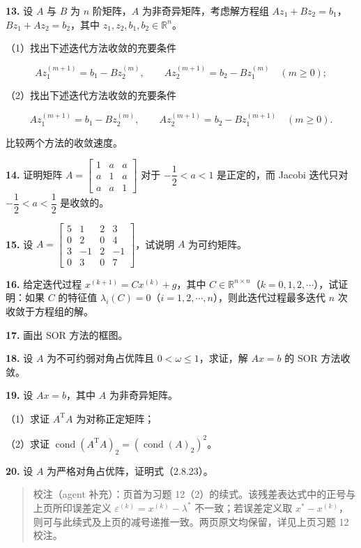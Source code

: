 \textbf{13.} 设 \(A\) 与 \(B\) 为 \(n\) 阶矩阵，\(A\) 为非奇异矩阵，考虑解方程组 \(Az_1+Bz_2=b_1\)，\(Bz_1+Az_2=b_2\)，其中 \(z_1,z_2,b_1,b_2\in\mathbb R^n\)。

（1）找出下述迭代方法收敛的充要条件

\[
Az_1^{(m+1)}=b_1-Bz_2^{(m)},\qquad Az_2^{(m+1)}=b_2-Bz_1^{(m)}\quad(m\geqslant0);
\]

（2）找出下述迭代方法收敛的充要条件

\[
Az_1^{(m+1)}=b_1-Bz_2^{(m)},\qquad Az_2^{(m+1)}=b_2-Bz_1^{(m+1)}\quad(m\geqslant0).
\]

比较两个方法的收敛速度。

\textbf{14.} 证明矩阵 \(A=\begin{bmatrix}1&a&a\\a&1&a\\a&a&1\end{bmatrix}\) 对于 \(-\dfrac12<a<1\) 是正定的，而 Jacobi 迭代只对 \(-\dfrac12<a<\dfrac12\) 是收敛的。

\textbf{15.} 设 \(A=\begin{bmatrix}5&1&2&3\\0&2&0&4\\3&-1&2&-1\\0&3&0&7\end{bmatrix}\)，试说明 \(A\) 为可约矩阵。

\textbf{16.} 给定迭代过程 \(x^{(k+1)}=Cx^{(k)}+g\)，其中 \(C\in\mathbb R^{n\times n}\)（\(k=0,1,2,\cdots\)），试证明：如果 \(C\) 的特征值 \(\lambda_i(C)=0\)（\(i=1,2,\cdots,n\)），则此迭代过程最多迭代 \(n\) 次收敛于方程组的解。

\textbf{17.} 画出 SOR 方法的框图。

\textbf{18.} 设 \(A\) 为不可约弱对角占优阵且 \(0<\omega\leqslant1\)，求证，解 \(Ax=b\) 的 SOR 方法收敛。

\textbf{19.} 设 \(Ax=b\)，其中 \(A\) 为非奇异矩阵。

（1）求证 \(A^{\mathrm T}A\) 为对称正定矩阵；

（2）求证 \(\operatorname{cond}(A^{\mathrm T}A)_2=(\operatorname{cond}(A)_2)^2\)。

\textbf{20.} 设 \(A\) 为严格对角占优阵，证明式（2.8.23）。

\begin{quote}
校注（agent 补充）：页首为习题 12（2）的续式。该残差表达式中的正号与上页所印误差定义 \(\varepsilon^{(k)}=x^{(k)}-\lambda^*\) 不一致；若误差定义取 \(x^*-x^{(k)}\)，则可与此续式及上页的减号递推一致。两页原文均保留，详见上页习题 12 校注。
\end{quote}

